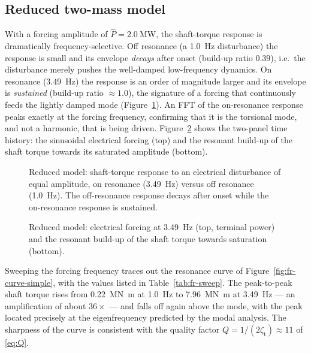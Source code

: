\subsection{Reduced two-mass model}
\label{subsec:fr-simplified}

With a forcing amplitude of $\hat{P} = \SI{2.0}{\mega\watt}$, the shaft-torque
response is dramatically frequency-selective. Off resonance (a
\SI{1.0}{\hertz} disturbance) the response is small and its envelope
\emph{decays} after onset (build-up ratio $0.39$), i.e.\ the disturbance merely
pushes the well-damped low-frequency dynamics. On resonance
(\SI{3.49}{\hertz}) the response is an order of magnitude larger and its
envelope is \emph{sustained} (build-up ratio $\approx 1.0$), the signature of a
forcing that continuously feeds the lightly damped mode
(Figure~\ref{fig:fr-onoff-simple}). An FFT of the on-resonance response peaks
exactly at the forcing frequency, confirming that it is the torsional mode, and
not a harmonic, that is being driven. Figure~\ref{fig:fr-buildup-simple} shows
the two-panel time history: the sinusoidal electrical forcing (top) and the
resonant build-up of the shaft torque towards its saturated amplitude (bottom).

\begin{figure}[t]
  \centering
  \caption{Reduced model: shaft-torque response to an electrical disturbance of
  equal amplitude, on resonance (\SI{3.49}{\hertz}) versus off resonance
  (\SI{1.0}{\hertz}). The off-resonance response decays after onset while the
  on-resonance response is sustained.}
  \label{fig:fr-onoff-simple}
\end{figure}

\begin{figure}[t]
  \centering
  \caption{Reduced model: electrical forcing at \SI{3.49}{\hertz} (top, terminal
  power) and the resonant build-up of the shaft torque towards saturation
  (bottom).}
  \label{fig:fr-buildup-simple}
\end{figure}

Sweeping the forcing frequency traces out the resonance curve of
Figure~\ref{fig:fr-curve-simple}, with the values listed in
Table~\ref{tab:fr-sweep}. The peak-to-peak shaft torque rises from
\SI{0.22}{\mega\newton\metre} at \SI{1.0}{\hertz} to
\SI{7.96}{\mega\newton\metre} at \SI{3.49}{\hertz} --- an amplification of about
$36\times$ --- and falls off again above the mode, with the peak located
precisely at the eigenfrequency predicted by the modal analysis. The
sharpness of the curve is consistent with the quality factor $Q =
1/(2\zeta_{\mathrm{t}}) \approx 11$ of \eqref{eq:Q}.

